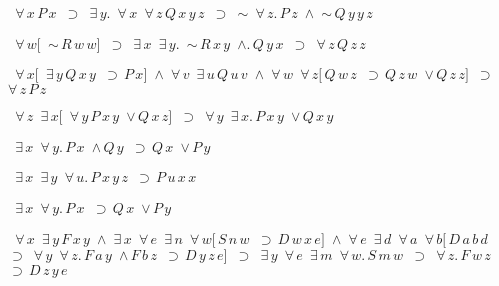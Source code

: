 \begin{description}
\item[\parbox{\textwidth}{X2131\index{X2131@X2131, {\bf Theorem}} }] \texttt{$ $ $\forall \,x \,P \,x $ $\supset $ $\exists \,y . $ $\forall \,x $ $\forall \,z \,Q \,x \,y \,z $ $\supset $ $\sim $ $\forall \,z . \,P \,z $ $\land $ $\sim \,Q \,y \,y \,z$}


\item[\parbox{\textwidth}{X2132\index{X2132@X2132, {\bf Theorem}} }] \texttt{$ $ $\forall \,w [ $ $\sim \,R \,w \,w ] $ $\supset $ $\exists \,x $ $\exists \,y . $ $\sim \,R \,x \,y $ $\land . \,Q \,y \,x $ $\supset $ $\forall \,z \,Q \,z \,z$}


\item[\parbox{\textwidth}{X2133\index{X2133@X2133, {\bf Theorem}} }] \texttt{$ $ $\forall \,x [ $ $\exists \,y \,Q \,x \,y $ $\supset \,P \,x ] $ $\land $ $\forall \,v $ $\exists \,u \,Q \,u \,v $ $\land $ $\forall \,w $ $\forall \,z [ \,Q \,w \,z $ $\supset \,Q \,z \,w $ $\lor \,Q \,z \,z ] $ $\supset $ $\forall \,z \,P \,z$}


\item[\parbox{\textwidth}{X2134\index{X2134@X2134, {\bf Theorem}} }] \texttt{$ $ $\forall \,z $ $\exists \,x [ $ $\forall \,y \,P \,x \,y $ $\lor \,Q \,x \,z ] $ $\supset $ $\forall \,y $ $\exists \,x . \,P \,x \,y $ $\lor \,Q \,x \,y$}


\item[\parbox{\textwidth}{X2135\index{X2135@X2135, {\bf Theorem}} }] \texttt{$ $ $\exists \,x $ $\forall \,y . \,P \,x $ $\land \,Q \,y $ $\supset \,Q \,x $ $\lor \,P \,y$}


\item[\parbox{\textwidth}{X2136\index{X2136@X2136, {\bf Theorem}} }] \texttt{$ $ $\exists \,x $ $\exists \,y $ $\forall \,u . \,P \,x \,y \,z $ $\supset \,P \,u \,x \,x$}


\item[\parbox{\textwidth}{X2137\index{X2137@X2137, {\bf Theorem}} }] \texttt{$ $ $\exists \,x $ $\forall \,y . \,P \,x $ $\supset \,Q \,x $ $\lor \,P \,y$}


\item[\parbox{\textwidth}{X2138\index{X2138@X2138, {\bf Theorem}} }] \texttt{$ $ $\forall \,x $ $\exists \,y \,F \,x \,y $ $\land $ $\exists \,x $ $\forall \,e $ $\exists \,n $ $\forall \,w [ \,S \,n \,w $ $\supset \,D \,w \,x \,e ] $ $\land $ $\forall \,e $ $\exists \,d $ $\forall \,a $ $\forall \,b [ \,D \,a \,b \,d $ $\supset $ $\forall \,y $ $\forall \,z . \,F \,a \,y $ $\land \,F \,b \,z $ $\supset \,D \,y \,z \,e ] $ $\supset $ $\exists \,y $ $\forall \,e $ $\exists \,m $ $\forall \,w . \,S \,m \,w $ $\supset $ $\forall \,z . \,F \,w \,z $ $\supset \,D \,z \,y \,e$}
\item
\end{description}

